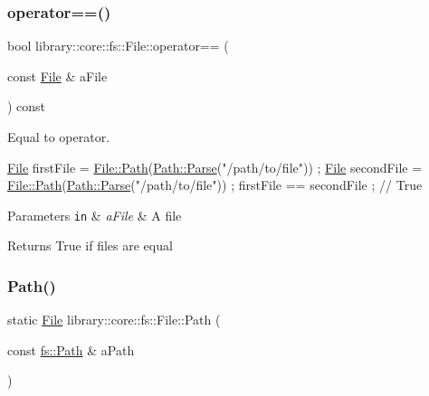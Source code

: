 \subsubsection{\texorpdfstring{operator==()}{operator==()}}
{\footnotesize\ttfamily bool library\+::core\+::fs\+::\+File\+::operator== (\begin{DoxyParamCaption}\item[{const \hyperlink{classlibrary_1_1core_1_1fs_1_1File}{File} \&}]{a\+File }\end{DoxyParamCaption}) const}



Equal to operator. 


\begin{DoxyCode}
\hyperlink{classlibrary_1_1core_1_1fs_1_1File_a7490060f19a21d4ee58bb6cec87a1ca6}{File} firstFile = \hyperlink{classlibrary_1_1core_1_1fs_1_1File_a0e0d8a8becb3cdd21775554e181452d8}{File::Path}(\hyperlink{classlibrary_1_1core_1_1fs_1_1Path_aebf5bd3af83e0b7376616e146f3e55df}{Path::Parse}(\textcolor{stringliteral}{"/path/to/file"})) ;
\hyperlink{classlibrary_1_1core_1_1fs_1_1File_a7490060f19a21d4ee58bb6cec87a1ca6}{File} secondFile = \hyperlink{classlibrary_1_1core_1_1fs_1_1File_a0e0d8a8becb3cdd21775554e181452d8}{File::Path}(\hyperlink{classlibrary_1_1core_1_1fs_1_1Path_aebf5bd3af83e0b7376616e146f3e55df}{Path::Parse}(\textcolor{stringliteral}{"/path/to/file"})) ;
firstFile == secondFile ; \textcolor{comment}{// True}
\end{DoxyCode}



\begin{DoxyParams}[1]{Parameters}
\mbox{\tt in}  & {\em a\+File} & A file \\
\hline
\end{DoxyParams}
\begin{DoxyReturn}{Returns}
True if files are equal 
\end{DoxyReturn}
\mbox{\label{classlibrary_1_1core_1_1fs_1_1File_a0e0d8a8becb3cdd21775554e181452d8}} 
\subsubsection{\texorpdfstring{Path()}{Path()}}
{\footnotesize\ttfamily static \hyperlink{classlibrary_1_1core_1_1fs_1_1File}{File} library\+::core\+::fs\+::\+File\+::\+Path (\begin{DoxyParamCaption}\item[{const \hyperlink{classlibrary_1_1core_1_1fs_1_1Path}{fs\+::\+Path} \&}]{a\+Path }\end{DoxyParamCaption})\hspace{0.3cm}{\ttfamily [static]}}



